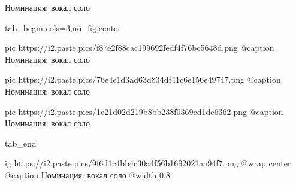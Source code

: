  
 
 
 
 

Номинация: вокал соло

\ifcmt
  tab_begin cols=3,no_fig,center

     pic https://i2.paste.pics/f87e2f88cac199692fedf4f76bc5648d.png
     @caption Номинация: вокал соло

     pic https://i2.paste.pics/76e4e1d3ad63d834df41c6e156e49747.png
     @caption Номинация: вокал соло

     pic https://i2.paste.pics/1e21d02d219b8bb238f0369cd1dc6362.png
     @caption Номинация: вокал соло

  tab_end
\fi

\ifcmt
  ig https://i2.paste.pics/9f6d1c4bb4c30a4f56b1692021aa94f7.png
  @wrap center
  @caption Номинация: вокал соло
  @width 0.8
\fi
